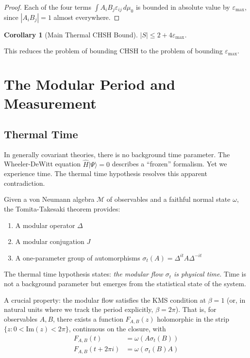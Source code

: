 \documentclass[12pt,a4paper]{article}
\newtheorem{corollary}[theorem]{Corollary}
\newcommand{\eps}{\varepsilon}
\begin{document}
\begin{proof}
Each of the four terms $\int A_i B_j \eps_{ij} \, d\mu_0$ is bounded in absolute value by $\eps_{\max}$, since $|A_i B_j| = 1$ almost everywhere.
\end{proof}

\begin{corollary}[Main Thermal CHSH Bound]
$|S| \leq 2 + 4\eps_{\max}$.
\end{corollary}

This reduces the problem of bounding CHSH to the problem of bounding $\eps_{\max}$.

\section{The Modular Period and Measurement}

\subsection{Thermal Time}

In generally covariant theories, there is no background time parameter. The Wheeler-DeWitt equation $\hat{H}|\Psi\rangle = 0$ describes a ``frozen'' formalism. Yet we experience time. The thermal time hypothesis \cite{ConnesRovelli1994} resolves this apparent contradiction.

Given a von Neumann algebra $\mathcal{M}$ of observables and a faithful normal state $\omega$, the Tomita-Takesaki theorem provides:
\begin{enumerate}
\item A modular operator $\Delta$
\item A modular conjugation $J$
\item A one-parameter group of automorphisms $\sigma_t(A) = \Delta^{it} A \Delta^{-it}$
\end{enumerate}

The thermal time hypothesis states: \emph{the modular flow $\sigma_t$ is physical time}. Time is not a background parameter but emerges from the statistical state of the system.

A crucial property: the modular flow satisfies the KMS condition at $\beta = 1$ (or, in natural units where we track the period explicitly, $\beta = 2\pi$). That is, for observables $A, B$, there exists a function $F_{A,B}(z)$ holomorphic in the strip $\{z : 0 < \mathrm{Im}(z) < 2\pi\}$, continuous on the closure, with
\begin{align}
F_{A,B}(t) &= \omega(A \sigma_t(B)) \\
F_{A,B}(t + 2\pi i) &= \omega(\sigma_t(B) A)
\end{align}
\end{document}
